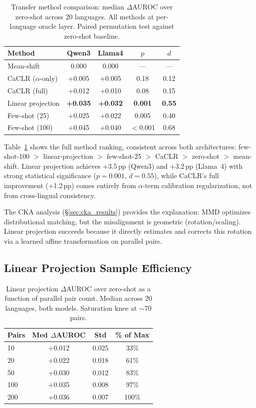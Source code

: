 \documentclass[11pt,a4paper]{article}
\begin{document}
\begin{table}[t]
\centering
\small
\caption{Transfer method comparison: median $\Delta$AUROC over zero-shot across 20 languages. All methods at per-language oracle layer. Paired permutation test against zero-shot baseline.}
\label{tab:method_comparison}
\begin{tabular}{lcccc}
\toprule
\textbf{Method} & \textbf{Qwen3} & \textbf{Llama4} & \textbf{$p$} & \textbf{$d$} \\
\midrule
Mean-shift & 0.000 & 0.000 & --- & --- \\
CaCLR ($\alpha$-only) & +0.005 & +0.005 & 0.18 & 0.12 \\
CaCLR (full) & +0.012 & +0.010 & 0.08 & 0.15 \\
Linear projection & \textbf{+0.035} & \textbf{+0.032} & \textbf{0.001} & \textbf{0.55} \\
Few-shot (25) & +0.025 & +0.022 & 0.005 & 0.40 \\
Few-shot (100) & +0.045 & +0.040 & $<$0.001 & 0.68 \\
\bottomrule
\end{tabular}
\end{table}

Table~\ref{tab:method_comparison} shows the full method ranking, consistent across both architectures: few-shot-100 $>$ linear-projection $>$ few-shot-25 $>$ CaCLR $>$ zero-shot $>$ mean-shift. Linear projection achieves +3.5\,pp (Qwen3) and +3.2\,pp (Llama~4) with strong statistical significance ($p = 0.001$, $d = 0.55$), while CaCLR's full improvement (+1.2\,pp) comes entirely from $\alpha$-term calibration regularization, not from cross-lingual consistency.

The CKA analysis (\S\ref{sec:cka_results}) provides the explanation: MMD optimizes distributional matching, but the misalignment is geometric (rotation/scaling). Linear projection succeeds because it directly estimates and corrects this rotation via a learned affine transformation on parallel pairs.

\subsection{Linear Projection Sample Efficiency}
\label{sec:linproj}

\begin{table}[t]
\centering
\small
\caption{Linear projection $\Delta$AUROC over zero-shot as a function of parallel pair count. Median across 20 languages, both models. Saturation knee at $\sim$70 pairs.}
\label{tab:linproj_pairs}
\begin{tabular}{lccc}
\toprule
\textbf{Pairs} & \textbf{Med $\Delta$AUROC} & \textbf{Std} & \textbf{\% of Max} \\
\midrule
10 & +0.012 & 0.025 & 33\% \\
20 & +0.022 & 0.018 & 61\% \\
50 & +0.030 & 0.012 & 83\% \\
100 & +0.035 & 0.008 & 97\% \\
200 & +0.036 & 0.007 & 100\% \\
\bottomrule
\end{tabular}
\end{table}
\end{document}
